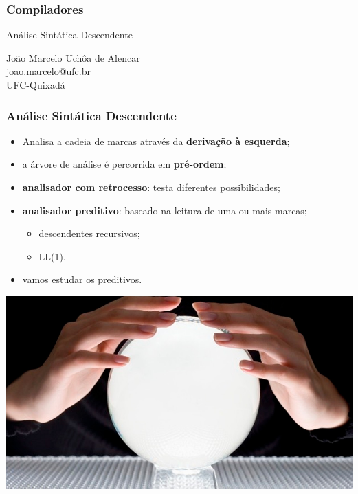 \documentclass[table]{beamer}
\begin{document}
\begin{frame}
   \frametitle{Compiladores}
   \large
   \begin{center}
   Análise Sintática Descendente
   \end{center}
   \scriptsize
   \begin{center}
      João Marcelo Uchôa de Alencar \\
      joao.marcelo@ufc.br \\
      UFC-Quixadá
   \end{center}
\end{frame}

\begin{frame}
   \tableofcontents
\end{frame}

\begin{frame}
   \frametitle{Análise Sintática Descendente}
   \begin{itemize}
      \item Analisa a cadeia de marcas através da \textbf{derivação à esquerda};
      \item a árvore de análise é percorrida em \textbf{pré-ordem};
      \item \textbf{analisador com retrocesso}: testa diferentes possibilidades;
      \item \textbf{analisador preditivo}: baseado na leitura de uma ou mais marcas;
      \begin{itemize}
         \item descendentes recursivos;
	 \item LL(1).
      \end{itemize}
      \item vamos estudar os preditivos.
   \end{itemize}
   \centering
   \includegraphics[scale=0.15]{figuras/previsao.jpg}
\end{frame}
\end{document}
